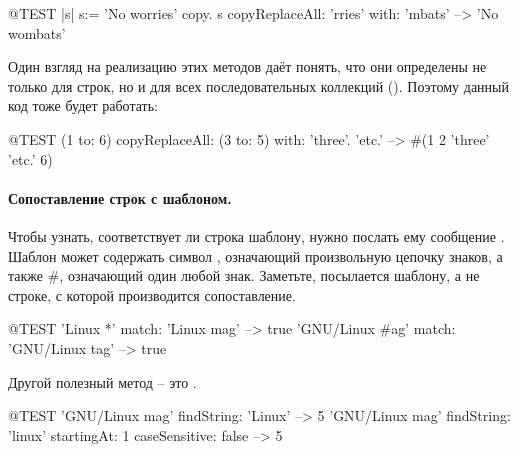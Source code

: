 \documentclass[a4paper,10pt,twoside]{book}
\begin{document}
\begin{code}{@TEST |s| s:= 'No worries' copy.}
s copyReplaceAll: 'rries' with: 'mbats' --> 'No wombats'
\end{code}

Один взгляд на реализацию этих методов даёт понять, что они определены не только для строк, но и для всех последовательных коллекций (). Поэтому данный код тоже будет работать:

\begin{code}{@TEST}
(1 to: 6) copyReplaceAll: (3 to: 5) with: { 'three'. 'etc.' } --> #(1 2 'three' 'etc.' 6)
\end{code}

\paragraph{Сопоставление строк с шаблоном.}
Чтобы узнать, соответствует ли строка шаблону, нужно послать ему сообщение .
Шаблон может содержать символ \ct{*}, означающий произвольную цепочку знаков, а также \#, означающий один любой знак. Заметьте,  посылается шаблону, а не строке, с которой производится сопоставление.

\begin{code}{@TEST}
'Linux *' match: 'Linux mag'                      --> true
'GNU/Linux #ag' match: 'GNU/Linux tag' --> true
\end{code}

Другой полезный метод -- это .
\begin{code}{@TEST}
'GNU/Linux mag' findString: 'Linux'                                                      --> 5
'GNU/Linux mag' findString: 'linux' startingAt: 1 caseSensitive: false  --> 5
\end{code}
\end{document}
